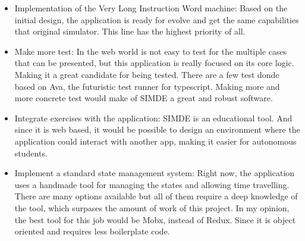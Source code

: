 \begin{itemize}

\item Implementation of the Very Long Instruction Word machine: Based on the
 initial design, the application is ready for evolve and get the same capabilities that original simulator.
 This line has the highest priority of all.

\item Make more test: In the web world is not easy to test for the multiple cases that can be presented,
but this application is really focused on its core logic. Making it a great candidate for being tested. 
There are a few test donde based on Ava, the futuristic test runner for typescript. Making more and 
more concrete test would make of SIMDE a great and robust software.

\item Integrate exercises with the application: SIMDE is an educational tool. And since it is web based, 
it would be possible to design an environment where the application could interact with another app, 
making it easier for autonomous students.

\item Implement a standard state management system: Right now, the application uses a handmade tool for
managing the states and allowing time travelling. There are many options available but all of them require
a deep knowledge of the tool, which surpases the amount of work of this project. In my opinion, the best 
tool for this job would be Mobx, instead of Redux. Since it is object oriented and requires less boilerplate code.

\end{itemize}